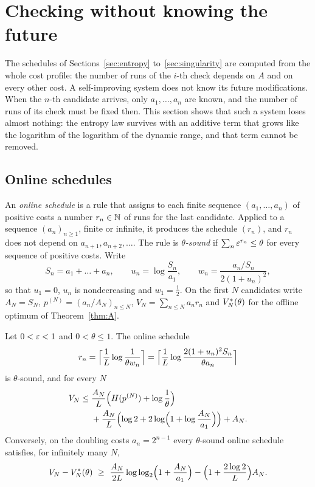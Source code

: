 \section{Checking without knowing the future}\label{sec:online}

The schedules of Sections~\ref{sec:entropy} to~\ref{sec:singularity} are computed from the whole cost profile: the number of runs of the $i$-th check depends on $A$ and on every other cost. A self-improving system does not know its future modifications. When the $n$-th candidate arrives, only $a_{1},\dots,a_{n}$ are known, and the number of runs of its check must be fixed then. This section shows that such a system loses almost nothing: the entropy law survives with an additive term that grows like the logarithm of the logarithm of the dynamic range, and that term cannot be removed.

\subsection{Online schedules}

An \emph{online schedule} is a rule that assigns to each finite sequence $(a_{1},\dots,a_{n})$ of positive costs a number $r_{n}\in\mathbb{N}$ of runs for the last candidate. Applied to a sequence $(a_{n})_{n\ge1}$, finite or infinite, it produces the schedule $(r_{n})$, and $r_{n}$ does not depend on $a_{n+1},a_{n+2},\dots$. The rule is \emph{$\theta$-sound} if $\sum_{n}\varepsilon^{r_{n}}\le\theta$ for every sequence of positive costs. Write
\[
S_{n}=a_{1}+\dots+a_{n},\qquad u_{n}=\log\frac{S_{n}}{a_{1}},\qquad w_{n}=\frac{a_{n}/S_{n}}{2(1+u_{n})^{2}},
\]
so that $u_{1}=0$, $u_{n}$ is nondecreasing and $w_{1}=\frac12$. On the first $N$ candidates write $A_{N}=S_{N}$, $p^{(N)}=(a_{n}/A_{N})_{n\le N}$, $V_{N}=\sum_{n\le N}a_{n}r_{n}$ and $V^{*}_{N}(\theta)$ for the offline optimum of Theorem~\ref{thm:A}.

\begin{mainthm}\label{thm:G}
Let $0<\varepsilon<1$ and $0<\theta\le1$. The online schedule
\begin{equation}\label{eq:onlinerule}
r_{n}=\Bigl\lceil\frac1L\log\frac{1}{\theta w_{n}}\Bigr\rceil=\Bigl\lceil\frac1L\log\frac{2(1+u_{n})^{2}S_{n}}{\theta a_{n}}\Bigr\rceil
\end{equation}
is $\theta$-sound, and for every $N$
\begin{equation}\label{eq:onlineupper}
\begin{aligned}
V_{N}\le{}&\frac{A_{N}}{L}\Bigl(H(p^{(N)})+\log\frac1\theta\Bigr)\\
&+\frac{A_{N}}{L}\Bigl(\log2+2\log\Bigl(1+\log\frac{A_{N}}{a_{1}}\Bigr)\Bigr)+A_{N}.
\end{aligned}
\end{equation}
Conversely, on the doubling costs $a_{n}=2^{n-1}$ every $\theta$-sound online schedule satisfies, for infinitely many $N$,
\begin{equation}\label{eq:onlinelower}
V_{N}-\Vs_{N}(\theta)\ \ge\ \frac{A_{N}}{2L}\log\log_{2}\Bigl(1+\frac{A_{N}}{a_{1}}\Bigr)-\Bigl(1+\frac{2\log2}{L}\Bigr)A_{N}.
\end{equation}
\end{mainthm}

